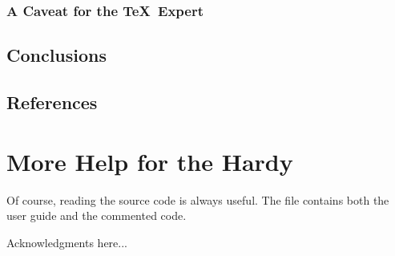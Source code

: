 \subsubsection*{A Caveat for the \TeX\ Expert}
\subsection{Conclusions}
\subsection{References}


\section{More Help for the Hardy}

Of course, reading the source code is always useful.  The file
 contains both the user guide and the commented
code.

\begin{acks}
  Acknowledgments here...

\end{acks}
